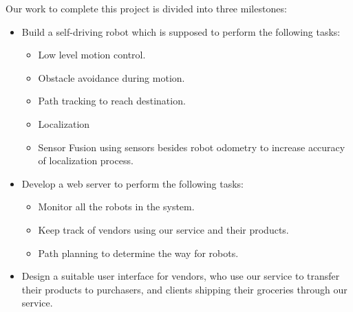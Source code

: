 Our work to complete this project is divided into three milestones:
 \begin{itemize}
\item   Build a self-driving robot which is supposed to perform the following tasks:
    \begin{itemize}
    \item Low level motion control.
    \item Obstacle avoidance during motion.
    \item Path tracking to reach destination.
    \item Localization
    \item Sensor Fusion using sensors besides robot odometry to increase accuracy of localization process.
    \end{itemize}
\item  Develop a web server to perform the following tasks:
    \begin{itemize}
    \item Monitor all the robots in the system.
    \item Keep track of vendors using our service and their products.
    \item Path planning to determine the way for robots.
    \end{itemize}
\item  Design a suitable user interface for vendors, who use our service to transfer their products to purchasers, and clients shipping their groceries through our service.

\end{itemize}

